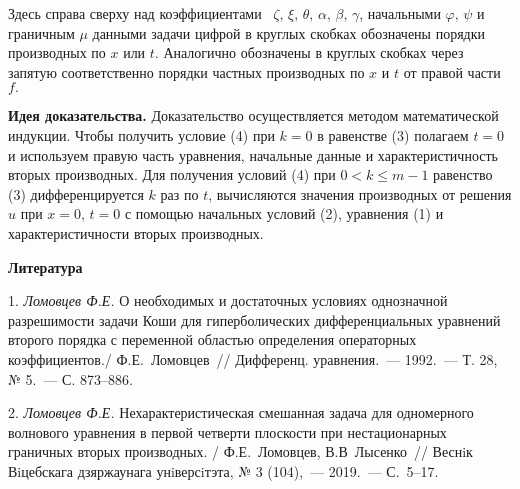  Здесь справа сверху над коэффициентами ~$\zeta,\, \xi,\,
\theta,\, \alpha,\, \beta,\, \gamma$, начальными $\varphi,\,\psi$
и граничным $\mu$ данными задачи цифрой в круглых скобках
обозначены порядки производных по $x$ или $t.$ Аналогично
обозначены в круглых скобках через запятую соответственно порядки
частных производных по $x$ и $t$ от правой части $f.$

{\bf Идея доказательства.} Доказательство осуществляется методом
математической индукции. Чтобы получить условие (4) при $k=0$ в
равенстве (3) полагаем $t=0$ и используем правую часть уравнения,
начальные данные и характеристичность вторых производных. Для
получения условий (4) при $0<k\leq m-1$ равенство (3)
дифференцируется $k$ раз по $t$, вычисляются значения производных
от решения $u$ при $x=0, \, t=0$ с помощью начальных условий (2),
уравнения (1) и характеристичности вторых производных.


\smallskip \centerline{\bf Литература}\nopagebreak

1. \textit{Ломовцев Ф.Е.} {О необходимых и достаточных условиях
однозначной разрешимости задачи Коши для гиперболических
дифференциальных уравнений второго порядка с переменной областью
определения операторных коэффициентов./ Ф.Е.~Ломовцев~//
Дифференц. уравнения.~--- 1992.~--- Т. 28, № 5.~--- С. 873--886.}


2. \textit{Ломовцев Ф.Е.} {Нехарактеристическая смешанная задача
для одномерного волнового уравнения в первой четверти плоскости
при нестационарных граничных вторых производных. / Ф.Е.~Ломовцев,
В.В~Лысенко~// Веснiк Вiцебскага дзяржаунага унiверсiтэта, № 3
(104),~--- 2019.~--- С.~5--17.}
